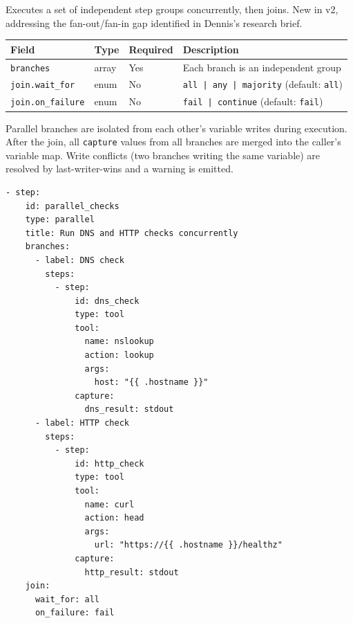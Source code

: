 Executes a set of independent step groups concurrently, then joins.  New in v2,
addressing the fan-out/fan-in gap identified in Dennis's research brief.

\begin{center}
\begin{tabular}{lllp{5cm}}
\hline
\textbf{Field} & \textbf{Type} & \textbf{Required} & \textbf{Description} \\
\hline
\texttt{branches}          & array  & Yes & Each branch is an independent group \\
\texttt{join.wait\_for}    & enum   & No  & \texttt{all | any | majority} (default: \texttt{all}) \\
\texttt{join.on\_failure}  & enum   & No  & \texttt{fail | continue} (default: \texttt{fail}) \\
\hline
\end{tabular}
\end{center}

Parallel branches are isolated from each other's variable writes during
execution.  After the join, all \texttt{capture} values from all branches are
merged into the caller's variable map.  Write conflicts (two branches writing the
same variable) are resolved by last-writer-wins and a warning is emitted.

\begin{verbatim}
- step:
    id: parallel_checks
    type: parallel
    title: Run DNS and HTTP checks concurrently
    branches:
      - label: DNS check
        steps:
          - step:
              id: dns_check
              type: tool
              tool:
                name: nslookup
                action: lookup
                args:
                  host: "{{ .hostname }}"
              capture:
                dns_result: stdout
      - label: HTTP check
        steps:
          - step:
              id: http_check
              type: tool
              tool:
                name: curl
                action: head
                args:
                  url: "https://{{ .hostname }}/healthz"
              capture:
                http_result: stdout
    join:
      wait_for: all
      on_failure: fail
\end{verbatim}

